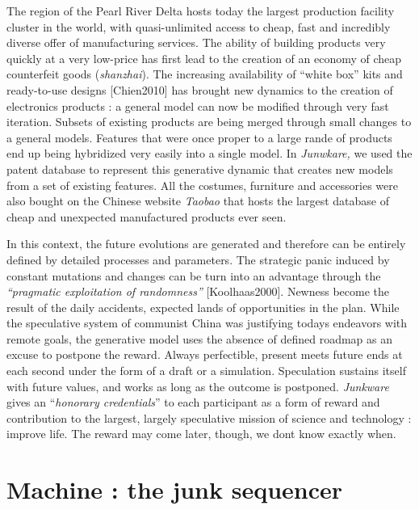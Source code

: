 \bigskip

The region of the Pearl River Delta hosts today the largest production
facility cluster in the world, with quasi-unlimited access to cheap,
fast and incredibly diverse offer of manufacturing services. The
ability of building products very quickly at a very low-price has first
lead to the creation of an economy of cheap counterfeit goods
(\textit{shanzhai}). The increasing availability of
{\textquotedblleft}white box{\textquotedblright} kits and ready-to-use
designs [Chien2010] has brought new dynamics to the creation of
electronics products : a general model can now be modified through very
fast iteration. Subsets of existing products are being merged through
small changes to a general models. Features that were once proper to a
large rande of products end up being hybridized very easily into a
single model. In \textit{Junwkare, }we used the patent database to
represent this generative dynamic that creates new models from a set of
existing features. All the costumes, furniture and accessories were
also bought on the Chinese website \textit{Taobao }that hosts the
largest database of cheap and unexpected manufactured products ever
seen.


\bigskip

In this context, the future evolutions are generated and therefore can
be entirely defined by detailed processes and parameters. The strategic
panic induced by constant mutations and changes can be turn into an
advantage through the \textit{{\textquotedblleft}}\textit{pragmatic
explo}\textit{i}\textit{tation of randomness{\textquotedblright}
}[Koolhaas2000]. Newness become the result of the daily accidents,
expected lands of opportunities in the plan. While the speculative
system of communist China was justifying today{\textquotesingle}s
endeavors with remote goals, the generative model uses the absence of
defined roadmap as an excuse to postpone the reward. Always
perfectible, present meets future ends at each second under the form of
a draft or a simulation. Speculation sustains itself with future
values, and works as long as the outcome is postponed.
\textit{Junkware} gives an {\textquotedblleft}\textit{honorary
credentials}{\textquotedblright} to each participant as a form of
reward and contribution to the largest, largely speculative mission of
science and technology : improve life. The reward may come later,
though, we don{\textquotesingle}t know exactly when.

\section{Machine : the junk sequencer}
